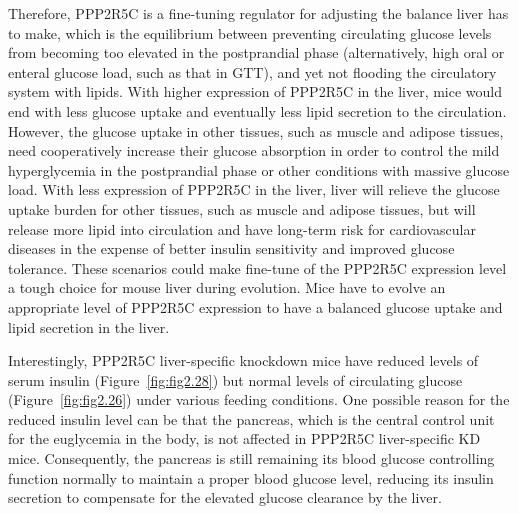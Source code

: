 Therefore, PPP2R5C is a fine-tuning regulator for adjusting the balance liver has to make, which is the equilibrium between preventing circulating glucose levels from becoming too elevated in the postprandial phase (alternatively, high oral or enteral glucose load, such as that in GTT), and yet not flooding the circulatory system with lipids. With higher expression of PPP2R5C in the liver, mice would end with less glucose uptake and eventually less lipid secretion to the circulation. However, the glucose uptake in other tissues, such as muscle and adipose tissues, need cooperatively increase their glucose absorption in order to control the mild hyperglycemia in the postprandial phase or other conditions with massive glucose load. With less expression of PPP2R5C in the liver, liver will relieve the glucose uptake burden for other tissues, such as muscle and adipose tissues, but will release more lipid into circulation and have long-term risk for cardiovascular diseases in the expense of better insulin sensitivity and improved glucose tolerance. These scenarios could make fine-tune of the PPP2R5C expression level a tough choice for mouse liver during evolution. Mice have to evolve an appropriate level of PPP2R5C expression to have a balanced glucose uptake and lipid secretion in the liver.

Interestingly, PPP2R5C liver-specific knockdown mice have reduced levels of serum insulin (Figure~\ref{fig:fig2.28}) but normal levels of circulating glucose (Figure~\ref{fig:fig2.26}) under various feeding conditions. One possible reason for the reduced insulin level can be that the pancreas, which is the central control unit for the euglycemia in the body, is not affected in PPP2R5C liver-specific KD mice. Consequently, the pancreas is still remaining its blood glucose controlling function normally to maintain a proper blood glucose level, reducing its insulin secretion to compensate for the elevated glucose clearance by the liver. 

